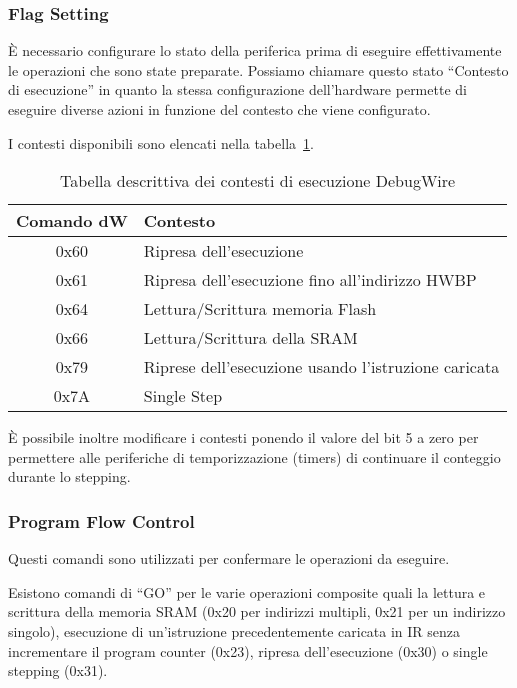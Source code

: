 \subsubsection{Flag Setting}

È necessario configurare lo stato della periferica prima di eseguire effettivamente le operazioni che sono state preparate. Possiamo chiamare questo stato ``Contesto di esecuzione'' in quanto la stessa configurazione dell'hardware permette di eseguire diverse azioni in funzione del contesto che viene configurato.

I contesti disponibili sono elencati nella tabella~\ref{tab:dw-contexts}.

\begin{table}[h]
    \centering
    \begin{tabular}{ c l }
        \textbf{Comando dW} & \textbf{Contesto} \\
        \hline
        0x60 & Ripresa dell'esecuzione\\
        0x61 & Ripresa dell'esecuzione fino all'indirizzo HWBP\\
        0x64 & Lettura/Scrittura memoria Flash\\
        0x66 & Lettura/Scrittura della SRAM\\
        0x79 & Riprese dell'esecuzione usando l'istruzione caricata\\
        0x7A & Single Step\\
        \hline
    \end{tabular}
    \caption[]{Tabella descrittiva dei contesti di esecuzione DebugWire\cite{site:dw-reverse-engeneering}}\label{tab:dw-contexts}
\end{table}

È possibile inoltre modificare i contesti ponendo il valore del bit 5 a zero per permettere alle periferiche di temporizzazione (timers) di continuare il conteggio durante lo stepping.

\subsubsection{Program Flow Control}

Questi comandi sono utilizzati per confermare le operazioni da eseguire.

Esistono comandi di ``GO'' per le varie operazioni composite quali la lettura e scrittura della memoria SRAM (0x20 per indirizzi multipli, 0x21 per un indirizzo singolo), esecuzione di un'istruzione precedentemente caricata in IR senza incrementare il program counter (0x23), ripresa dell'esecuzione (0x30) o single stepping (0x31).


